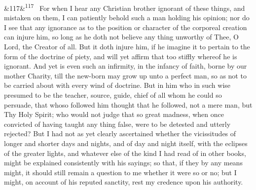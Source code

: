 \documentclass[12pt]{article}
\newcommand{\para}[1][]{\par\noindent\ifx&#1&\else\textsuperscript{\footnotesize #1}~\fi}
\begin{document}
\para[117] For when I hear any Christian brother ignorant of these things, and mistaken on them, I can patiently behold such a man holding his opinion; nor do I see that any ignorance as to the position or character of the corporeal creation can injure him, so long as he doth not believe any thing unworthy of Thee, O Lord, the Creator of all. But it doth injure him, if he imagine it to pertain to the form of the doctrine of piety, and will yet affirm that too stiffly whereof he is ignorant. And yet is even such an infirmity, in the infancy of faith, borne by our mother Charity, till the new-born may grow up unto a perfect man, so as not to be carried about with every wind of doctrine. But in him who in such wise presumed to be the teacher, source, guide, chief of all whom he could so persuade, that whoso followed him thought that he followed, not a mere man, but Thy Holy Spirit; who would not judge that so great madness, when once convicted of having taught any thing false, were to be detested and utterly rejected? But I had not as yet clearly ascertained whether the vicissitudes of longer and shorter days and nights, and of day and night itself, with the eclipses of the greater lights, and whatever else of the kind I had read of in other books, might be explained consistently with his sayings; so that, if they by any means might, it should still remain a question to me whether it were so or no; but I might, on account of his reputed sanctity, rest my credence upon his authority.
\end{document}

